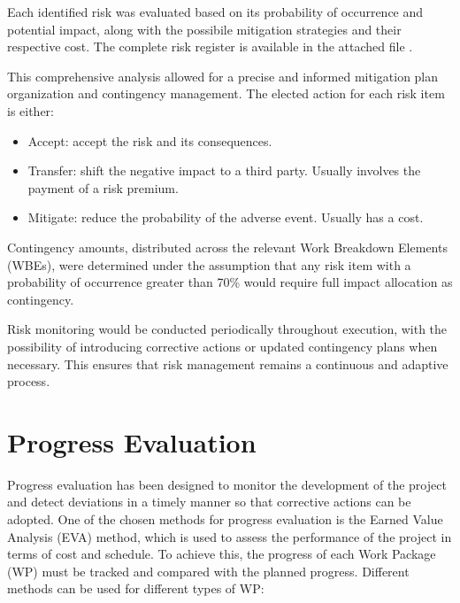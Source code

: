 Each identified risk was evaluated based on its probability of occurrence and potential impact, along with the possibile mitigation strategies and their respective cost.
The complete risk register is available in the attached file \cite{RiskRegister}.

This comprehensive analysis allowed for a precise and informed mitigation plan organization and contingency management.
The elected action for each risk item is either:
\begin{itemize}
    \item Accept: accept the risk and its consequences.
    \item Transfer: shift the negative impact to a third party. Usually involves the payment of a risk premium.
    \item Mitigate: reduce the probability of the adverse event. Usually has a cost.
\end{itemize}

Contingency amounts, distributed across the relevant Work Breakdown Elements (WBEs), were determined under the assumption that any risk item with a probability of occurrence greater than 70\% would require full impact allocation as contingency.

Risk monitoring would be conducted periodically throughout execution, with the possibility of introducing corrective actions or updated contingency plans when necessary. This ensures that risk management remains a continuous and adaptive process.

\section{Progress Evaluation}
Progress evaluation has been designed to monitor the development of the project and detect deviations in a timely manner so that corrective actions can be adopted. One of the chosen methods for progress evaluation is the Earned Value Analysis (EVA) method, which is used to assess the performance of the project in terms of cost and schedule. To achieve this, the progress of each Work Package (WP) must be tracked and compared with the planned progress. Different methods can be used for different types of WP:

